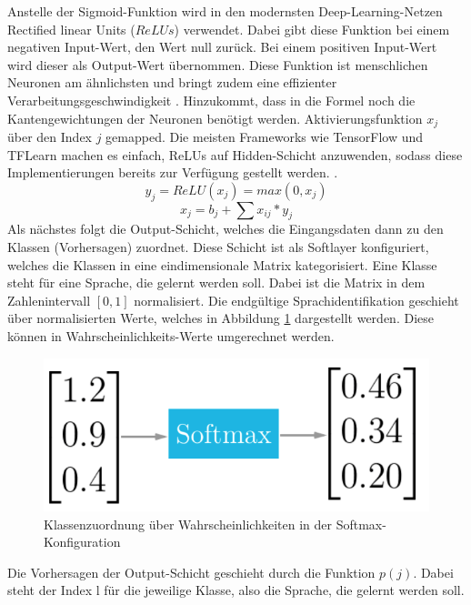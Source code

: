 Anstelle der Sigmoid-Funktion wird in den modernsten Deep-Learning-Netzen Rectified linear Units ($ReLUs$) verwendet. Dabei gibt diese Funktion bei einem negativen Input-Wert, den Wert null zurück. Bei einem positiven Input-Wert wird dieser als Output-Wert übernommen. Diese Funktion ist menschlichen Neuronen am ähnlichsten und bringt zudem eine effizienter Verarbeitungsgeschwindigkeit \cite{zeiler.2013}. Hinzukommt, dass in die Formel noch die Kantengewichtungen der Neuronen benötigt werden. Aktivierungsfunktion $x_{j}$ über den Index $j$ gemapped. 
Die meisten Frameworks wie TensorFlow und TFLearn machen es einfach, ReLUs auf Hidden-Schicht anzuwenden, sodass diese Implementierungen bereits zur Verfügung gestellt werden. \cite{GonzalezDominguez.2015}.
\begin{equation*}
y_{j} = ReLU(x_{j}) = max(0,x_{j}) 
\label{eq:ReLU}
\end{equation*}
\begin{equation}
x_{ j } = b_{ j } + \sum{ }{ }{ x_{ ij } * y_{j}}
\label{eq:Gewichte}
\end{equation}
Als nächstes folgt die Output-Schicht, welches die Eingangsdaten dann zu den Klassen (Vorhersagen) zuordnet. Diese Schicht ist als Softlayer konfiguriert, welches die Klassen in eine eindimensionale Matrix kategorisiert. Eine Klasse steht für eine Sprache, die gelernt werden soll. Dabei ist die Matrix in dem Zahlenintervall $[0,1]$ normalisiert. Die endgültige Sprachidentifikation geschieht über normalisierten Werte, welches in Abbildung \ref{fig:soft} dargestellt werden. Diese können in Wahrscheinlichkeits-Werte umgerechnet werden\cite{Kulbear.2017}.
\begin{figure}[h!]
	\centering
	\includegraphics[width=0.7\linewidth]{images/softmax}
	\caption{Klassenzuordnung über Wahrscheinlichkeiten in der Softmax-Konfiguration \cite{Kulbear.2017}} %
	\label{fig:soft}
\end{figure}
 Die Vorhersagen der Output-Schicht geschieht durch die Funktion $p(j)$. Dabei steht der Index l für die jeweilige Klasse, also die Sprache, die gelernt werden soll.  
